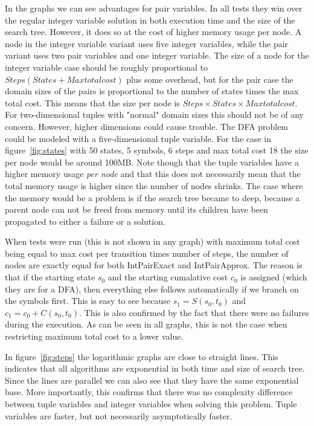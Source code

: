 \documentclass[a4paper,11pt]{article}
\begin{document}
In the graphs we can see advantages for pair variables. In all tests they win over the regular integer variable solution in both execution time and the size of the search tree. However, it does so at the cost of higher memory usage per node. A node in the integer variable variant uses five integer variables, while the pair variant uses two pair variables and one integer variable. The size of a node for the integer variable case should be roughly proportional to $Steps(States + Maxtotalcost)$ plus some overhead, but for the pair case the domain sizes of the pairs is proportional to the number of states times the max total cost. This means that the size per node is $Steps\times States\times Maxtotalcost$. For two-dimensional tuples with "normal" domain sizes this should not be of any concern. However, higher dimensions could cause trouble. The DFA problem could be modeled with a five-dimensional tuple variable. For the case in figure~\ref{fig:states} with 50 states, 5 symbols, 6 steps and max total cost 18 the size per node would be around 100MB. Note though that the tuple variables have a higher memory usage \textit{per node} and that this does not necessarily mean that the total memory usage is higher since the number of nodes shrinks. The case where the memory would be a problem is if the search tree became to deep, because a parent node can not be freed from memory until its children have been propagated to either a failure or a solution.

When tests were run (this is not shown in any graph) with maximum total cost being equal to max cost per transition times number of steps, the number of nodes are exactly equal for both IntPairExact and IntPairApprox. The reason is that if the starting state $s_0$ and the starting cumalative cost $c_0$ is assigned (which they are for a DFA), then everything else follows automatically if we branch on the symbols first. This is easy to see because $s_1=S(s_0, t_0)$ and $c_1=c_0+C(s_0, t_0)$. This is also confirmed by the fact that there were no failures during the execution. As can be seen in all graphs, this is not the case when restricting maximum total cost to a lower value.

In figure~\ref{fig:steps} the logarithmic graphs are close to straight lines. This indicates that all algorithms are exponential in both time and size of search tree. Since the lines are parallel we can also see that they have the same exponential base. More importantly, this confirms that there was no complexity difference between tuple variables and integer variables when solving this problem. Tuple variables are faster, but not necessarily asymptotically faster. 
\end{document}
